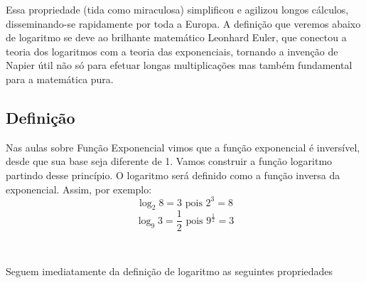 Essa propriedade (tida como miraculosa) simplificou e agilizou longos cálculos, disseminando-se rapidamente por toda a Europa. A definição que veremos abaixo de logaritmo se deve ao brilhante matemático Leonhard Euler, que conectou a teoria dos logaritmos com a teoria das exponenciais, tornando a invenção de Napier útil não só para efetuar longas multiplicações mas também fundamental para a matemática pura.

\subsection{Definição}

Nas aulas sobre Função Exponencial vimos que a função exponencial é inversível, desde que sua base seja diferente de 1. Vamos construir a função logaritmo partindo desse princípio. O logaritmo será definido como a função inversa da exponencial. Assim, por exemplo: $$\log_2{8}=3 \text{  pois  } 2^3=8$$ $$\log_9{3} = \frac{1}{2} \text{  pois  } 9^{\frac{1}{2}}=3$$

\label{def:log}\\


Seguem imediatamente da definição de logaritmo as seguintes propriedades

